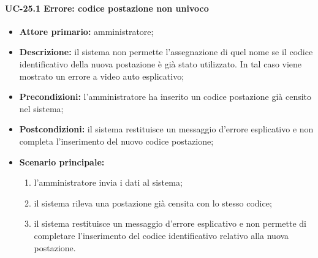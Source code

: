 \paragraph{UC-25.1 Errore: codice postazione non univoco}
    \begin{itemize}
	\item \textbf{Attore primario:} amministratore;
	\item \textbf{Descrizione:} il sistema non permette l'assegnazione di quel nome se il codice identificativo della nuova postazione è già stato utilizzato. In tal caso viene mostrato un errore a video auto esplicativo;
	\item \textbf{Precondizioni:} l'amministratore ha inserito un codice postazione già censito nel sistema;
	\item \textbf{Postcondizioni:} il sistema restituisce un messaggio d'errore esplicativo e non completa l'inserimento del nuovo codice postazione;
	\item \textbf{Scenario principale:}
	      \begin{enumerate}
	      	      \item l'amministratore invia i dati al sistema;
		      \item il sistema rileva una postazione già censita con lo stesso codice;
		      \item il sistema restituisce un messaggio d'errore esplicativo e non permette di completare l'inserimento del codice identificativo relativo alla nuova postazione.
	      \end{enumerate}
\end{itemize}
    

